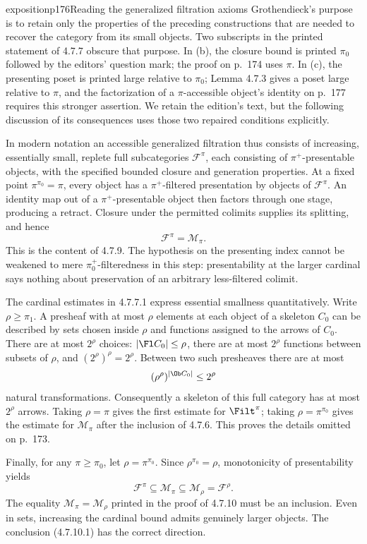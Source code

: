\begin{dcomment}{exposition}{p176}{Reading the generalized filtration axioms}
Grothendieck's purpose is to retain only the properties of the preceding constructions that are needed to recover the category from its small objects. Two subscripts in the printed statement of 4.7.7 obscure that purpose. In (b), the closure bound is printed $\pi_0$ followed by the editors' question mark; the proof on p.~174 uses $\pi$. In (c), the presenting poset is printed large relative to $\pi_0$; Lemma 4.7.3 gives a poset large relative to $\pi$, and the factorization of a $\pi$-accessible object's identity on p.~177 requires this stronger assertion. We retain the edition's text, but the following discussion of its consequences uses those two repaired conditions explicitly.

In modern notation an accessible generalized filtration thus consists of increasing, essentially small, replete full subcategories $\mathcal F^\pi$, each consisting of $\pi^+$-presentable objects, with the specified bounded closure and generation properties. At a fixed point $\pi^{\pi_0}=\pi$, every object has a $\pi^+$-filtered presentation by objects of $\mathcal F^\pi$. An identity map out of a $\pi^+$-presentable object then factors through one stage, producing a retract. Closure under the permitted colimits supplies its splitting, and hence
\[
 \mathcal F^\pi=\mathcal M_\pi.
\]
This is the content of 4.7.9. The hypothesis on the presenting index cannot be weakened to mere $\pi_0^+$-filteredness in this step: presentability at the larger cardinal says nothing about preservation of an arbitrary less-filtered colimit.

The cardinal estimates in 4.7.7.1 express essential smallness quantitatively. Write $\rho\geq\pi_1$. A presheaf with at most $\rho$ elements at each object of a skeleton $C_0$ can be described by sets chosen inside $\rho$ and functions assigned to the arrows of $C_0$. There are at most $2^\rho$ choices: $|\Fl C_0|\leq\rho$, there are at most $2^\rho$ functions between subsets of $\rho$, and $(2^\rho)^\rho=2^\rho$. Between two such presheaves there are at most
\[
 (\rho^\rho)^{|\Ob C_0|}\leq 2^\rho
\]
natural transformations. Consequently a skeleton of this full category has at most $2^\rho$ arrows. Taking $\rho=\pi$ gives the first estimate for $\Filt^\pi$; taking $\rho=\pi^{\pi_0}$ gives the estimate for $\mathcal M_\pi$ after the inclusion of 4.7.6. This proves the details omitted on p.~173.

Finally, for any $\pi\geq\pi_0$, let $\rho=\pi^{\pi_0}$. Since $\rho^{\pi_0}=\rho$, monotonicity of presentability yields
\[
 \mathcal F^\pi\subseteq\mathcal M_\pi
 \subseteq\mathcal M_\rho=\mathcal F^\rho.
\]
The equality $\mathcal M_\pi=\mathcal M_\rho$ printed in the proof of 4.7.10 must be an inclusion. Even in sets, increasing the cardinal bound admits genuinely larger objects. The conclusion (4.7.10.1) has the correct direction.
\end{dcomment}

